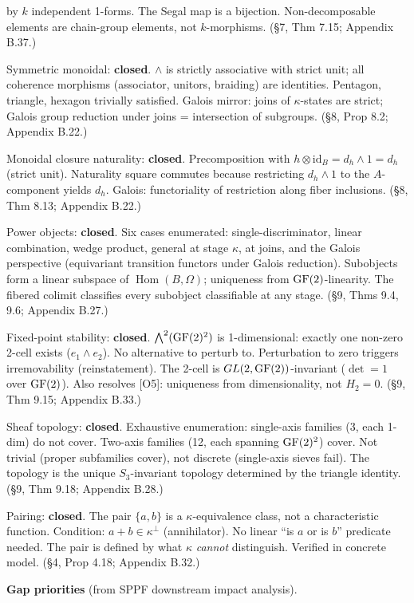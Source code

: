 \begin{description}[nosep,leftmargin=0.8cm]
    by $k$ independent 1-forms. The Segal map is a
    bijection. Non-decomposable elements are chain-group
    elements, not $k$-morphisms.
    (\S7, Thm 7.15; Appendix B.37.)
  \item[G12] Symmetric monoidal: \textbf{closed}.
    $\wedge$ is strictly associative with strict unit;
    all coherence morphisms (associator, unitors,
    braiding) are identities. Pentagon, triangle, hexagon
    trivially satisfied. Galois mirror: joins of
    $\kappa$-states are strict; Galois group reduction
    under joins = intersection of subgroups.
    (\S8, Prop 8.2; Appendix B.22.)
  \item[G13] Monoidal closure naturality: \textbf{closed}.
    Precomposition with $h \otimes \mathrm{id}_B =
    d_h \wedge 1 = d_h$ (strict unit). Naturality square
    commutes because restricting $d_h \wedge 1$ to the
    $A$-component yields $d_h$. Galois: functoriality of
    restriction along fiber inclusions.
    (\S8, Thm 8.13; Appendix B.22.)
  \item[G14] Power objects: \textbf{closed}. Six cases
    enumerated: single-discriminator, linear combination,
    wedge product, general at stage $\kappa$, at joins,
    and the Galois perspective (equivariant transition
    functors under Galois reduction). Subobjects form a
    linear subspace of $\operatorname{Hom}(B, \Omega)$;
    uniqueness from $\operatorname{GF}(2)$-linearity. The fibered
    colimit classifies every subobject classifiable at
    any stage.
    (\S9, Thms 9.4, 9.6; Appendix B.27.)
  \item[G15] Fixed-point stability: \textbf{closed}.
    $\bigwedge^2(\operatorname{GF}(2)^2)$ is 1-dimensional: exactly
    one non-zero 2-cell exists ($e_1 \wedge e_2$).
    No alternative to perturb to. Perturbation to zero
    triggers irremovability (reinstatement). The 2-cell
    is $GL(2,\operatorname{GF}(2))$-invariant ($\det = 1$ over
    $\operatorname{GF}(2)$). Also resolves [O5]: uniqueness from
    dimensionality, not $H_2 = 0$.
    (\S9, Thm 9.15; Appendix B.33.)
  \item[G16] Sheaf topology: \textbf{closed}. Exhaustive
    enumeration: single-axis families (3, each 1-dim)
    do not cover. Two-axis families (12, each spanning
    $\operatorname{GF}(2)^2$) cover. Not trivial (proper subfamilies
    cover), not discrete (single-axis sieves fail).
    The topology is the unique $S_3$-invariant topology
    determined by the triangle identity.
    (\S9, Thm 9.18; Appendix B.28.)
  \item[G17] Pairing: \textbf{closed}. The pair
    $\{a,b\}$ is a $\kappa$-equivalence class, not a
    characteristic function. Condition: $a + b \in
    \kappa^\perp$ (annihilator). No linear ``is $a$
    or is $b$'' predicate needed. The pair is defined
    by what $\kappa$ \emph{cannot} distinguish.
    Verified in concrete model.
    (\S4, Prop 4.18; Appendix B.32.)
\end{description}

\medskip
\noindent\textbf{Gap priorities} (from SPPF downstream
impact analysis).



